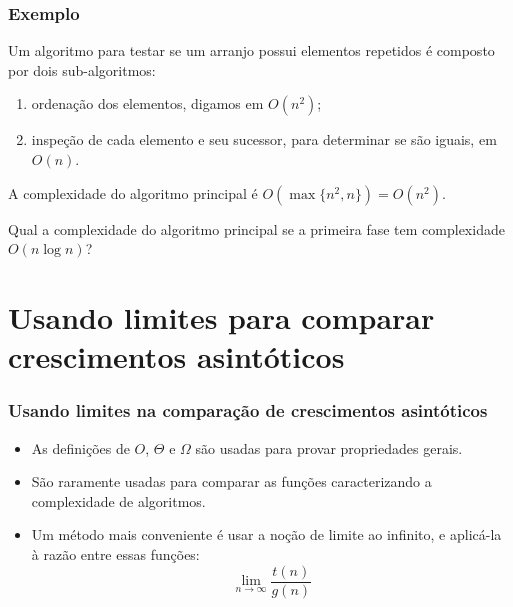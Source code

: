 \documentclass{beamer}
\begin{document}
\begin{frame}
\frametitle{Exemplo}

\begin{example}
  Um algoritmo para testar se um arranjo possui elementos repetidos é composto por dois sub-algoritmos:
  \begin{enumerate}
    \item ordenação dos elementos, digamos em $O(n^2)$;
    \item inspeção de cada elemento e seu sucessor, para determinar se são iguais, em $O(n)$.
    \end{enumerate}
    A complexidade do algoritmo principal é $O(\max\{n^2, n\}) = O(n^2)$.
\end{example}

\pause
\begin{problem}
  Qual a complexidade do algoritmo principal se a primeira fase tem complexidade
  $O(n \log n)$?
\end{problem}

\end{frame}

\section{Usando limites para comparar crescimentos asintóticos}

\begin{frame}
\frametitle{Usando limites na comparação de crescimentos asintóticos}

\begin{itemize}
\item As definições de $O$, $\Theta$ e $\Omega$ são usadas para 
  provar propriedades gerais.
\item São raramente usadas para comparar as funções caracterizando a
  complexidade de algoritmos.
\item Um método mais conveniente é usar a noção de limite ao infinito, e
  aplicá-la à razão entre essas funções:
  \[\lim_{n \to \infty} \frac{t(n)}{g(n)}\]
\end{itemize}

\end{frame}
\end{document}
